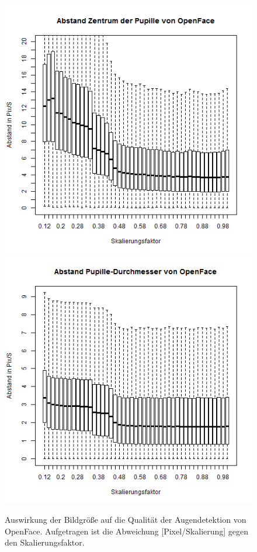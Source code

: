 \begin{figure}
	\centering
	\includegraphics[width=\linewidth]{Eye_Img_Box/Openface_PC}\\
	\includegraphics[width=\linewidth]{Eye_Img_Box/Openface_PW}
	\caption{Auswirkung der Bildgröße auf die Qualität der Augendetektion von OpenFace. Aufgetragen ist die Abweichung [Pixel/Skalierung] gegen den Skalierungsfaktor.}
	\label{OpenFace_Eye}
\end{figure}
